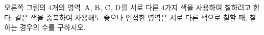\hspace*{2mm}\begin{minipage}[t]{\dimexpr\linewidth-2mm\relax}\vspace{0pt}
\noindent\begin{minipage}[t]{0.58\linewidth}\vspace{0pt}\raggedright 오른쪽 그림의 $4$개의 영역~$\mathrm{A}$, $\mathrm{B}$, $\mathrm{C}$, $\mathrm{D}$를 서로 다른 $4$가지 색을 사용하여 칠하려고 한다. 같은 색을 중복하여 사용해도 좋으나 인접한 영역은 서로 다른 색으로 칠할 때, 칠하는 경우의 수를 구하시오. \end{minipage}\hfill\begin{minipage}[t]{0.4\linewidth}\vspace{0pt}\centering \resizebox{\ifdim\width>\linewidth\linewidth\else\width\fi}{!}{}\end{minipage}\par\end{minipage}
